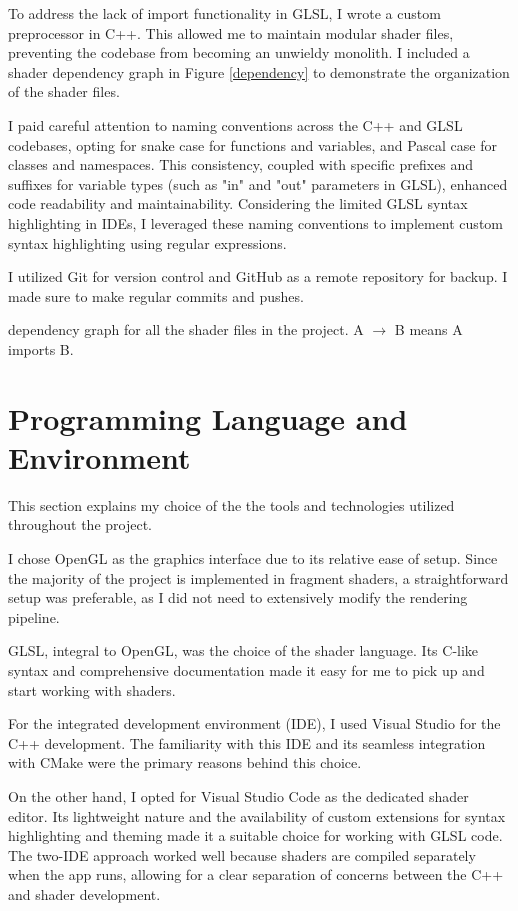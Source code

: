 To address the lack of import functionality in GLSL, I wrote a custom preprocessor in C++. This allowed me to maintain modular shader files, preventing the codebase from becoming an unwieldy monolith. I included a shader dependency graph in Figure \ref{dependency} to demonstrate the organization of the shader files.

I paid careful attention to naming conventions across the C++ and GLSL codebases, opting for snake case for functions and variables, and Pascal case for classes and namespaces. This consistency, coupled with specific prefixes and suffixes for variable types (such as "in" and "out" parameters in GLSL), enhanced code readability and maintainability. Considering the limited GLSL syntax highlighting in IDEs, I leveraged these naming conventions to implement custom syntax highlighting using regular expressions.

I utilized Git for version control and GitHub as a remote repository for backup. I made sure to make regular commits and pushes.

{dependency graph for all the shader files in the project. A $\rightarrow$ B means A imports B.}

\section{Programming Language and Environment}
\label{sec:2.5}

This section explains my choice of the the tools and technologies utilized throughout the project.

I chose OpenGL as the graphics interface due to its relative ease of setup. Since the majority of the project is implemented in fragment shaders, a straightforward setup was preferable, as I did not need to extensively modify the rendering pipeline.

GLSL, integral to OpenGL, was the choice of the shader language. Its C-like syntax and comprehensive documentation made it easy for me to pick up and start working with shaders.

For the integrated development environment (IDE), I used Visual Studio for the C++ development. The familiarity with this IDE and its seamless integration with CMake were the primary reasons behind this choice.

On the other hand, I opted for Visual Studio Code as the dedicated shader editor. Its lightweight nature and the availability of custom extensions for syntax highlighting and theming made it a suitable choice for working with GLSL code. The two-IDE approach worked well because shaders are compiled separately when the app runs, allowing for a clear separation of concerns between the C++ and shader development.



